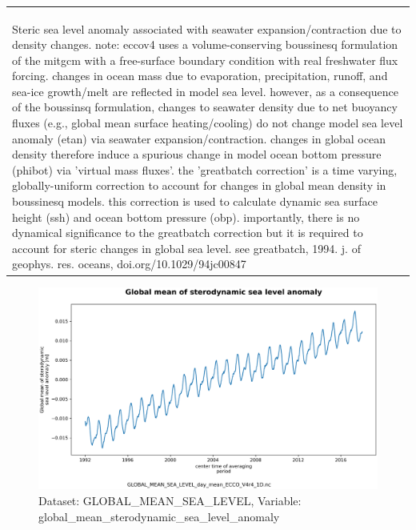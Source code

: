 \begin{longtable}{|m{}|m{}|m{}|m{}|}
{{{{{\hspace*{0.5cm}global\_mean\_sterodynamic\_sea\_level\_anomaly: valid\_min = -0.017658796143049296\\
}}}}} \\ \hline
\rowcolor{lightgray} \multicolumn{4}{|c|}{\textbf{Comments}} \\ \hline
\multicolumn{4}{|p{1\textwidth}|}{\footnotesize{{Steric sea level anomaly associated with seawater expansion/contraction due to density changes. note: eccov4 uses a volume-conserving boussinesq formulation of the mitgcm with a free-surface boundary condition with real freshwater flux forcing. changes in ocean mass due to evaporation, precipitation, runoff, and sea-ice growth/melt are reflected in model sea level. however, as a consequence of the boussinsq formulation, changes to seawater density due to net buoyancy fluxes (e.g., global mean surface heating/cooling) do not change model sea level anomaly (etan) via seawater expansion/contraction. changes in global ocean density therefore induce a spurious change in model ocean bottom pressure (phibot) via 'virtual mass fluxes'. the 'greatbatch correction' is a time varying, globally-uniform correction to account for changes in global mean density in boussinesq models. this correction is used to calculate dynamic sea surface height (ssh) and ocean bottom pressure (obp). importantly, there is no dynamical significance to the greatbatch correction but it is required to account for steric changes in global sea level. see greatbatch, 1994. j. of geophys. res. oceans, doi.org/10.1029/94jc00847}}} \\ \hline
\end{longtable}

\begin{figure}[H]
\centering
\includegraphics[scale=0.55]{../images/plots/v4r4/oneD_plots/Global_Mean_Sea_Level/global_mean_sterodynamic_sea_level_anomaly.png}
\caption{Dataset: GLOBAL\_MEAN\_SEA\_LEVEL, Variable: global\_mean\_sterodynamic\_sea\_level\_anomaly}
\label{tab:table-GLOBAL_MEAN_SEA_LEVEL_global_mean_sterodynamic_sea_level_anomaly-Plot}
\end{figure}
\newpage
